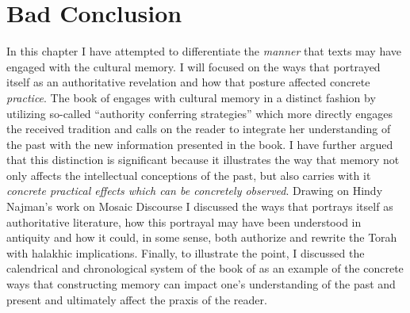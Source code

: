 
\section{Bad Conclusion}
In this chapter I have attempted to differentiate the \emph{manner} that \rwb texts may have engaged with the cultural memory. I will focused on the ways that \jub portrayed itself as an authoritative revelation and how that posture affected concrete \emph{practice}. The book of \jub engages with cultural memory in a distinct fashion \visavis \ga by utilizing so-called ``authority conferring strategies'' which more directly engages the received tradition and calls on the reader to integrate her understanding of the past with the new information presented in the book. I have further argued that this distinction is significant because it illustrates the way that memory not only affects the intellectual conceptions of the past, but also carries with it \emph{concrete practical effects which can be concretely observed}. Drawing on Hindy Najman's work on Mosaic Discourse I discussed the ways that \jub portrays itself as authoritative literature, how this portrayal may have been understood in antiquity and how it could, in some sense, both authorize and rewrite the Torah with halakhic implications. Finally, to illustrate the point, I discussed the calendrical and chronological system of the book of \jub as an example of the concrete ways that constructing memory can impact one's understanding of the past and present and ultimately affect the praxis of the reader.